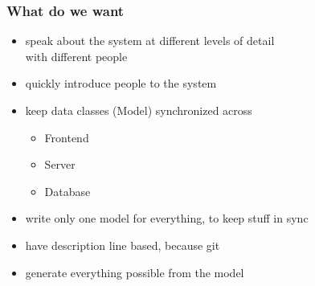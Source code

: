 \documentclass[xelatex,13pt]{beamer}
\begin{document}
\begin{frame}
	\frametitle{What do we want}
	\begin{itemize}
		\item speak about the system at different levels of detail\\
		with different people
		\item quickly introduce people to the system
		\item keep data classes (Model) synchronized across
		\begin{itemize}
			\item Frontend
			\item Server
			\item Database
		\end{itemize}
		\item write only one model for everything, to keep stuff in sync
		\item have description line based, because git
		\item generate everything possible from the model
	\end{itemize}
\end{frame}
\end{document}
